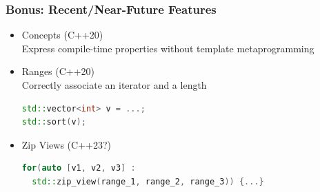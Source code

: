 \documentclass{beamer}
\begin{document}
\begin{frame}[fragile]
  \frametitle{Bonus: Recent/Near-Future Features}
  \begin{itemize}
  \item Concepts (C++20)\\
    Express compile-time properties without template metaprogramming
  \item Ranges (C++20)\\
    Correctly associate an iterator and a length
  \begin{lstlisting}[language=C++]
std::vector<int> v = ...;
std::sort(v);
  \end{lstlisting}
  \item Zip Views (C++23?)
  \begin{lstlisting}[language=C++]
for(auto [v1, v2, v3] :
  std::zip_view(range_1, range_2, range_3)) {...}
  \end{lstlisting}
  \end{itemize}
\end{frame}
\end{document}

